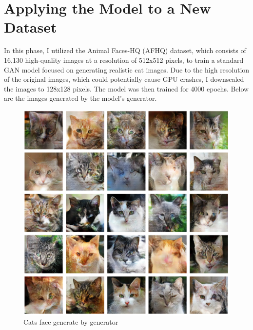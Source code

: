 


\section{Applying the Model to a New Dataset}
In this phase, I utilized the Animal Faces-HQ (AFHQ) dataset, which consists of 16,130 high-quality 
images at a resolution of 512x512 pixels, to train a standard GAN model focused on generating realistic 
cat images. Due to the high resolution of the original images, which could potentially cause GPU crashes, 
I downscaled the images to 128x128 pixels. The model was then trained for 4000 epochs. Below are the images 
generated by the model’s generator.


\begin{figure}[h]
    \centering
    \includegraphics[width=1.0\textwidth]{./Images/apply_new_dataset.jpg} 
    \caption{Cats face generate by generator}
    \label{fig:apply new dataset}
\end{figure}
